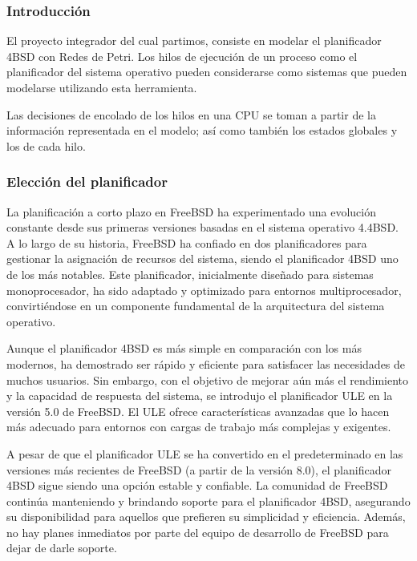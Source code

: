 \subsubsection{Introducción}

El proyecto integrador del cual partimos, consiste en modelar el planificador 4BSD con Redes de Petri. Los hilos de ejecución de un proceso como el planificador del sistema operativo pueden considerarse como sistemas que pueden modelarse utilizando esta herramienta.\par

Las decisiones de encolado de los hilos en una CPU se toman a partir de la información representada en el modelo; así como también los estados globales y los de cada hilo.\par


\subsubsection{Elección del planificador}

La planificación a corto plazo en FreeBSD ha experimentado una evolución constante desde sus primeras versiones basadas en el sistema operativo 4.4BSD\cite{bib3}. A lo largo de su historia, FreeBSD ha confiado en dos planificadores para gestionar la asignación de recursos del sistema, siendo el planificador 4BSD uno de los más notables. Este planificador, inicialmente diseñado para sistemas monoprocesador, ha sido adaptado y optimizado para entornos multiprocesador, convirtiéndose en un componente fundamental de la arquitectura del sistema operativo.\par

Aunque el planificador 4BSD es más simple en comparación con los más modernos, ha demostrado ser rápido y eficiente para satisfacer las necesidades de muchos usuarios. Sin embargo, con el objetivo de mejorar aún más el rendimiento y la capacidad de respuesta del sistema, se introdujo el planificador ULE en la versión 5.0 de FreeBSD. El ULE ofrece características avanzadas que lo hacen más adecuado para entornos con cargas de trabajo más complejas y exigentes.\par

A pesar de que el planificador ULE se ha convertido en el predeterminado en las versiones más recientes de FreeBSD (a partir de la versión 8.0), el planificador 4BSD sigue siendo una opción estable y confiable. La comunidad de FreeBSD continúa manteniendo y brindando soporte para el planificador 4BSD, asegurando su disponibilidad para aquellos que prefieren su simplicidad y eficiencia. Además, no hay planes inmediatos por parte del equipo de desarrollo de FreeBSD para dejar de darle soporte.\par

